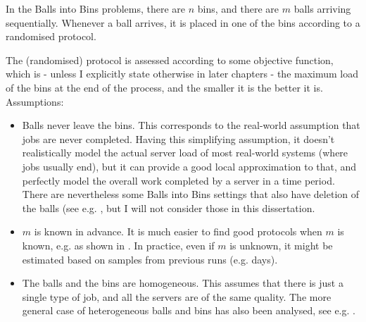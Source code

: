 In the Balls into Bins problems, there are $n$ bins, and there are $m$ balls arriving sequentially. Whenever a ball arrives, it is placed in one of the bins according to a randomised protocol. 


The (randomised) protocol is assessed according to some objective function, which is - unless I explicitly state otherwise in later chapters - the maximum load of the bins at the end of the process, and the smaller it is the better it is.\\


Assumptions:


\begin{itemize}
    \item
    Balls never leave the bins. This corresponds to the real-world assumption that jobs are never completed. Having this simplifying assumption, it doesn't realistically model the actual server load of most real-world systems (where jobs usually end), but it can provide a good local approximation  to that, and perfectly model the overall work completed by a server in a time period. There are nevertheless some Balls into Bins settings that also have deletion of the balls (see e.g. \cite{azar1999twochoice}, but I will not consider those in this dissertation.
    \item
    $m$ is known in advance. It is much easier to find good protocols when $m$ is known, e.g. as shown in \cite{feldheim2021longtermthinning}. In practice, even if $m$ is unknown, it might be estimated based on samples from previous runs (e.g. days).
    \item
    The balls and the bins are homogeneous. This assumes that there is just a single type of job, and all the servers are of the same quality. The more general case of heterogeneous balls and bins has also been analysed, see e.g. \cite{berenbrink2008weighted}.
\end{itemize}













